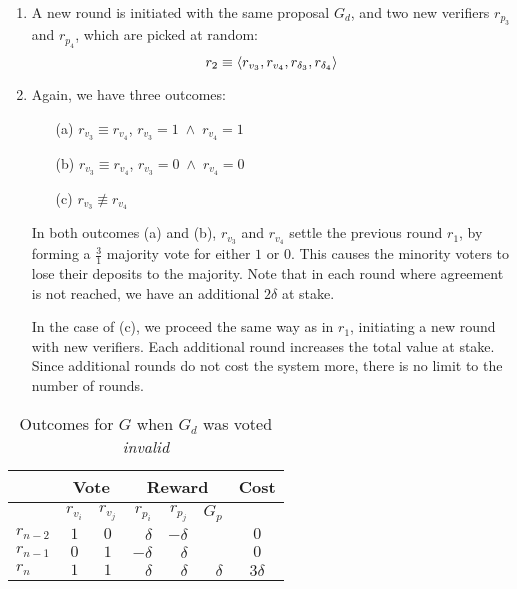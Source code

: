 \begin{enumerate}
    \item A new round is initiated with the same proposal $G_d$, and two new
        verifiers $r_{p_3}$ and $r_{p_4}$, which are picked at random:
        \begin{equation*}
            r_2 \equiv \langle r_{v_3}, r_{v_4}, r_{\delta_3}, r_{\delta_4} \rangle
        \end{equation*}
    \item Again, we have three outcomes:
        \smallskip
        \begin{enumerate}
            \item[(a)] $r_{v_3} \equiv r_{v_4}$, \qquad $r_{v_3} = 1 \; \wedge \; r_{v_4} = 1$
            \item[(b)] $r_{v_3} \equiv r_{v_4}$, \qquad $r_{v_3} = 0 \; \wedge \; r_{v_4} = 0$
            \item[(c)] $r_{v_3} \not\equiv r_{v_4}$
        \end{enumerate}
        \smallskip
        In both outcomes (a) and (b), $r_{v_3}$ and $r_{v_4}$ settle the
        previous round $r_1$, by forming a $\frac{3}{1}$ majority vote for
        either $1$ or $0$. This causes the minority voters to lose their
        deposits to the majority. Note that in each round where agreement is
        not reached, we have an additional $2\delta$ at stake.

        In the case of (c), we proceed the same way as in $r_1$, initiating a
        new round with new verifiers.  Each additional round increases the
        total value at stake. Since additional rounds do not cost the system
        more, there is no limit to the number of rounds.
\end{enumerate}

\begin{table}[hbt]
    \caption{Outcomes for $G$ when $G_d$ was voted \emph{invalid}}
    \begin{tabular}{lccrrrc}
    \toprule
        \hspace   & \multicolumn{2}{c}{Vote} & \multicolumn{3}{c}{Reward} & Cost                    \\
    \midrule
        \hspace   & $r_{v_i}$  & $r_{v_j}$   & $r_{p_i}$ & $r_{p_j}$ & $G_p$    &                   \\
    \addlinespace[0.5em]
        $r_{n-2}$ & $1$        & $0$         & $\delta$  & $-\delta$ &          & $0$               \\
        $r_{n-1}$ & $0$        & $1$         & $-\delta$ & $\delta$  &          & $0$               \\
        $r_{n}$   & $1$        & $1$         & $\delta$  & $\delta$  & $\delta$ & $3\delta$         \\
    \bottomrule
    \end{tabular}
\end{table}

